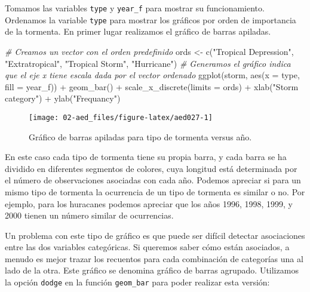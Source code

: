\documentclass[
]{book}
\newenvironment{Shaded}{\begin{snugshade}}{\end{snugshade}}
\newcommand{\AttributeTok}[1]{\textcolor[rgb]{0.77,0.63,0.00}{#1}}
\newcommand{\CommentTok}[1]{\textcolor[rgb]{0.56,0.35,0.01}{\textit{#1}}}
\newcommand{\FunctionTok}[1]{\textcolor[rgb]{0.00,0.00,0.00}{#1}}
\newcommand{\NormalTok}[1]{#1}
\newcommand{\OtherTok}[1]{\textcolor[rgb]{0.56,0.35,0.01}{#1}}
\newcommand{\SpecialCharTok}[1]{\textcolor[rgb]{0.00,0.00,0.00}{#1}}
\newcommand{\StringTok}[1]{\textcolor[rgb]{0.31,0.60,0.02}{#1}}
\begin{document}
Tomamos las variables \texttt{type} y \texttt{year\_f} para mostrar su funcionamiento. Ordenamos la variable \texttt{type} para mostrar los gráficos por orden de importancia de la tormenta. En primer lugar realizamos el gráfico de barras apiladas.

\begin{Shaded}
\begin{Highlighting}[]
\CommentTok{\# Creamos un vector con el orden predefinido}
\NormalTok{ords }\OtherTok{\textless{}{-}} \FunctionTok{c}\NormalTok{(}\StringTok{"Tropical Depression"}\NormalTok{, }\StringTok{"Extratropical"}\NormalTok{, }\StringTok{"Tropical Storm"}\NormalTok{, }\StringTok{"Hurricane"}\NormalTok{)}
\CommentTok{\# Generamos el gráfico indica que el eje x tiene escala dada por el vector ordenado}
\FunctionTok{ggplot}\NormalTok{(storm, }\FunctionTok{aes}\NormalTok{(}\AttributeTok{x =}\NormalTok{ type, }\AttributeTok{fill =}\NormalTok{ year\_f)) }\SpecialCharTok{+} 
  \FunctionTok{geom\_bar}\NormalTok{() }\SpecialCharTok{+} 
  \FunctionTok{scale\_x\_discrete}\NormalTok{(}\AttributeTok{limits =}\NormalTok{ ords) }\SpecialCharTok{+}
  \FunctionTok{xlab}\NormalTok{(}\StringTok{"Storm category"}\NormalTok{) }\SpecialCharTok{+} \FunctionTok{ylab}\NormalTok{(}\StringTok{"Frequancy"}\NormalTok{) }
\end{Highlighting}
\end{Shaded}

\begin{figure}

{\centering \texttt{[image: 02-aed\_files/figure-latex/aed027-1]} 

}

\caption{Gráfico de barras apiladas para tipo de tormenta versus año.}\label{fig:aed027}
\end{figure}

En este caso cada tipo de tormenta tiene su propia barra, y cada barra se ha dividido en diferentes segmentos de colores, cuya longitud está determinada por el número de observaciones asociadas con cada año. Podemos apreciar si para un mismo tipo de tormenta la ocurrencia de un tipo de tormenta es similar o no. Por ejemplo, para los huracanes podemos apreciar que los años 1996, 1998, 1999, y 2000 tienen un número similar de ocurrencias.

Un problema con este tipo de gráfico es que puede ser difícil detectar asociaciones entre las dos variables categóricas. Si queremos saber cómo están asociados, a menudo es mejor trazar los recuentos para cada combinación de categorías una al lado de la otra. Este gráfico se denomina gráfico de barras agrupado. Utilizamos la opción \texttt{dodge} en la función \texttt{geom\_bar} para poder realizar esta versión:
\end{document}
